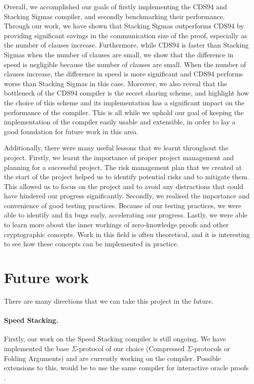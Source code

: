 Overall, we accomplished our goals of firstly implementing the CDS94 \cite{CDS94} and Stacking 
Sigmas \cite{StackingSigmas} compiler, and secondly benchmarking their performance. Through our 
work, we have shown that Stacking Sigmas outperforms CDS94 by providing significant savings in 
the communication size of the proof, especially as the number of clauses increase. 
Furthermore, while CDS94 is faster than Stacking Sigmas when the number of clauses are small,
we show that the difference in speed is negligible because the number of clauses are small. 
When the number of clauses increase, the difference in speed is more significant and CDS94 
performs worse than Stacking Sigmas in this case. Moreover, we also reveal that the bottleneck of the CDS94 compiler is the secret sharing scheme,
and highlight how the choice of this scheme and its implementation has a significant impact on the performance
of the compiler. This is all while we uphold our goal of keeping the implementation of the compiler
easily usable and extensible, in order to lay a good foundation for future work in this area. 

Additionally, there were many useful lessons that we learnt throughout the project. Firstly, we 
learnt the importance of proper project management and planning for a successful project. The 
risk management plan that we created at the start of the project helped us to identify potential
risks and to mitigate them. This allowed us to focus on the project and to avoid any distractions
that could have hindered our progress significantly. Secondly, we realised the importance 
and convenience of good testing practices. Because of our testing practices, we were able to
identify and fix bugs early, accelerating our progress. Lastly, we were able to learn more about 
the inner workings of zero-knowledge proofs and other cryptographic concepts. Work in this field 
is often theoretical, and it is interesting to see how these concepts can be implemented in practice.

\section{Future work}
\label{sec:futurework}
There are many directions that we can take this project in the future. 

\paragraph{Speed Stacking.} Firstly, our work on the 
Speed Stacking compiler \cite{SpeedStacking} is still ongoing. We have implemented the base 
$\Sigma$-protocol of our choice (Compressed $\Sigma$-protocols or Folding Arguments) and 
are currently working on the compiler. Possible extensions to this, would be to use the same 
compiler for interactive oracle proofs \cite{iops}. 

